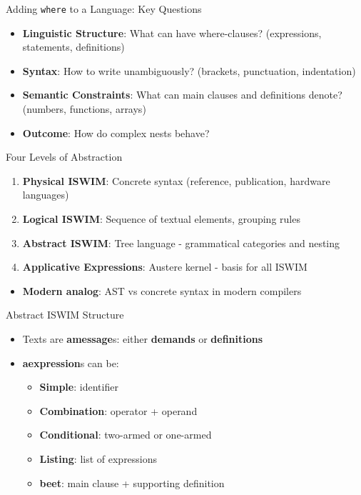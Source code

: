 \documentclass[10pt]{beamer}
\begin{document}
\begin{frame}{Adding \texttt{where} to a Language: Key Questions}
\begin{itemize}
\item \textbf{Linguistic Structure}: What can have where-clauses? (expressions, statements, definitions)
\item \textbf{Syntax}: How to write unambiguously? (brackets, punctuation, indentation)
\item \textbf{Semantic Constraints}: What can main clauses and definitions denote? (numbers, functions, arrays)
\item \textbf{Outcome}: How do complex nests behave?
\end{itemize}
\end{frame}

\begin{frame}{Four Levels of Abstraction}
\begin{enumerate}
\item \textbf{Physical ISWIM}: Concrete syntax (reference, publication, hardware languages)
\item \textbf{Logical ISWIM}: Sequence of textual elements, grouping rules
\item \textbf{Abstract ISWIM}: Tree language - grammatical categories and nesting
\item \textbf{Applicative Expressions}: Austere kernel - basis for all ISWIM
\end{enumerate}
\begin{itemize}
\item \textbf{Modern analog}: AST vs concrete syntax in modern compilers
\end{itemize}
\end{frame}

\begin{frame}{Abstract ISWIM Structure}
\begin{itemize}
\item Texts are \textbf{amessage}s: either \textbf{demands} or \textbf{definitions}
\item \textbf{aexpression}s can be:
  \begin{itemize}
  \item \textbf{Simple}: identifier
  \item \textbf{Combination}: operator + operand
  \item \textbf{Conditional}: two-armed or one-armed
  \item \textbf{Listing}: list of expressions
  \item \textbf{beet}: main clause + supporting definition
  \end{itemize}
\end{itemize}
\end{frame}
\end{document}
